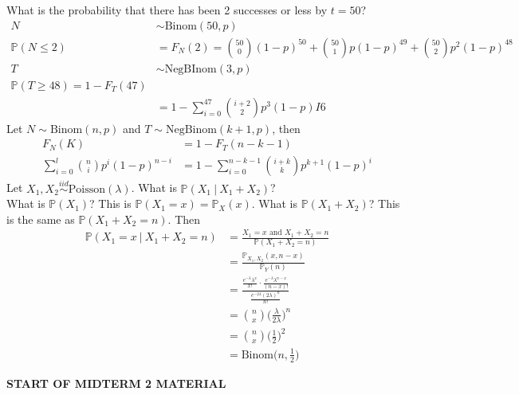 \documentclass[12pt]{article}
\newcommand{\prob}[1]{\mathbb{P}(#1)}
\newcommand{\cprob}[2]{\mathbb{P}(#1 ~|~ #2)}
\newcommand{\probsub}[2]{\mathbb{P}_{#1}(#2)}
\newcommand{\iid}{\stackrel{iid}{\sim}}
\begin{document}
 What is the probability that there has been 2 successes or less by $t = 50$? 
 $$\begin{aligned} N &\sim \text{Binom}(50, p) \\ \prob{N \leq 2} &= F_N(2) = \binom{50}{0}(1 - p)^{50} + \binom{50}{1}p(1- p)^{49} + \binom{50}{2}p^2(1 - p)^{48} \\ T &\sim \text{NegBInom}(3, p) \\ \prob{T \geq 48} = 1- F_T(47) \\ &= 1 - \sum_{i = 0}^{47} \binom{i + 2}{2} p^3(1 - p)I6 \end{aligned} $$ 
 Let $N \sim \text{Binom}(n, p)$ and $T \sim \text{NegBinom}(k + 1, p)$, then $$\begin{aligned} F_N(K) &= 1 - F_T(n - k - 1) \\ \sum_{i = 0}^l \binom{n}{i} p^i (1 - p)^{n - i} &= 1 - \sum_{i = 0}^{n - k - 1} \binom{i + k}{k} p^{k + 1} (1 - p)^ i \end{aligned} $$ 
 Let $X_1, X_2 \iid \text{Poisson}(\lambda)$. What is $\cprob{X_1}{X_1 + X_2}$? \\ 
 What is $\prob{X_1}$? This is $\prob{X_1 = x} = \probsub{X}{x}$. What is $\prob{X_1 + X_2}$? This is the same as $\prob{X_1 + X_2 = n}$. Then $$\begin{aligned} \cprob{X_1 = x}{X_1 + X_2 = n} &= \frac{X_1 = x \text{ and } X_1 + X_2 = n}{\prob{X_1 + X_2 = n}} \\ &= \frac{\probsub{X_1, X_2}{x, n - x}}{\probsub{Y}{n}} \\  &= \frac{\frac{e^{-\lambda} \lambda^x}{x!} \cdot \frac{e^{-\lambda} \lambda^{n - x}}{(n - x)!}}{\frac{e^{-2\lambda}(2\lambda)^n}{n!}} \\ &= \binom{n}{x} \Big( \frac{\lambda}{2\lambda}\Big)^n \\ &= \binom{n}{x} \Big( \frac{1}{2}\Big)^2 \\ &= \text{Binom}\Big(n, \frac{1}{2}\Big)
  \end{aligned} $$ 
  
\begin{center}  \textbf{START OF MIDTERM 2 MATERIAL} \end{center}
\end{document}
